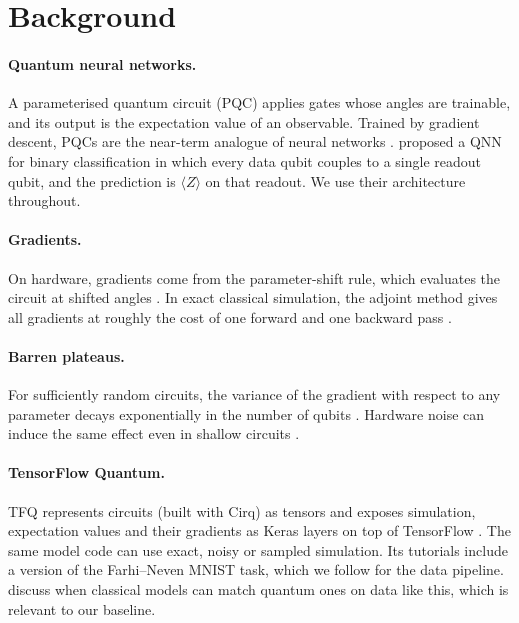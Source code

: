 \section{Background}
\label{sec:background}

\paragraph{Quantum neural networks.}
A parameterised quantum circuit (PQC) applies gates whose angles are trainable, and its output is the
expectation value of an observable. Trained by gradient descent, PQCs are the near-term analogue of neural
networks \citep{preskill2018nisq,cerezo2021vqa}. \citet{farhi2018classification} proposed a QNN for binary
classification in which every data qubit couples to a single readout qubit, and the prediction is
$\langle Z\rangle$ on that readout. We use their architecture throughout.

\paragraph{Gradients.}
On hardware, gradients come from the parameter-shift rule, which evaluates the circuit at shifted
angles \citep{mitarai2018qcl,schuld2019gradients}. In exact classical simulation, the adjoint method gives
all gradients at roughly the cost of one forward and one backward pass \citep{jones2020adjoint}.

\paragraph{Barren plateaus.}
For sufficiently random circuits, the variance of the gradient with respect to any parameter decays
exponentially in the number of qubits \citep{mcclean2018barren}. Hardware noise can induce the same
effect even in shallow circuits \citep{wang2021noise}.

\paragraph{TensorFlow Quantum.}
TFQ \citep{broughton2020tfq} represents circuits (built with Cirq) as tensors and exposes simulation,
expectation values and their gradients as Keras layers on top of TensorFlow \citep{abadi2016tensorflow}.
The same model code can use exact, noisy or sampled simulation. Its tutorials include a version of the
Farhi--Neven MNIST task, which we follow for the data pipeline. \citet{huang2021power} discuss when
classical models can match quantum ones on data like this, which is relevant to our baseline.
